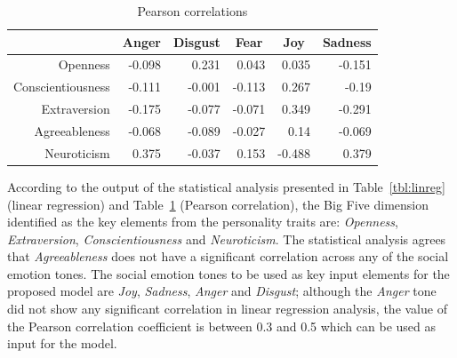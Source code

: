 \documentclass[graybox]{svmult}
\begin{document}
{{{\begin{table}[!ht]
\centering
\begin{tabular}{@{}rrrrrr@{}}
\toprule
                  & \multicolumn{1}{c}{Anger}  & \multicolumn{1}{c}{Disgust} & \multicolumn{1}{c}{Fear}   & \multicolumn{1}{c}{Joy}    & \multicolumn{1}{c}{Sadness} \\ 
\midrule
Openness          & -0.098 & 0.231   & 0.043  & 0.035  & -0.151  \\
Conscientiousness & -0.111 & -0.001  & -0.113 & 0.267  & -0.19   \\
Extraversion      & -0.175 & -0.077  & -0.071 & 0.349  & -0.291  \\
Agreeableness     & -0.068 & -0.089  & -0.027 & 0.14   & -0.069  \\
Neuroticism       & 0.375  & -0.037  & 0.153  & -0.488 & 0.379   \\ 

\bottomrule
\end{tabular}
\caption{Pearson correlations}
\label{tab:pearson}
\end{table}



According to the output of the statistical analysis presented in
Table~\ref{tbl:linreg} (linear regression) and Table~\ref{tab:pearson}
(Pearson correlation), the Big Five dimension identified as the key
elements from the personality traits are: {\emph{Openness}},
{\emph{Extraversion}}, {\emph{Conscientiousness}} and
{\emph{Neuroticism}}. The statistical analysis agrees that
{\emph{Agreeableness}} does not have a significant correlation across
any of the social emotion tones. The social emotion tones to be used
as key input elements for the proposed model are {\emph{Joy}},
{\emph{Sadness}}, {\emph{Anger}} and {\emph{Disgust}}; although the
{\emph{Anger}} tone did not show any significant correlation in linear
regression analysis, the value of the Pearson correlation coefficient
is between 0.3 and 0.5 which can be used as input for the model.


}}}
\end{document}

